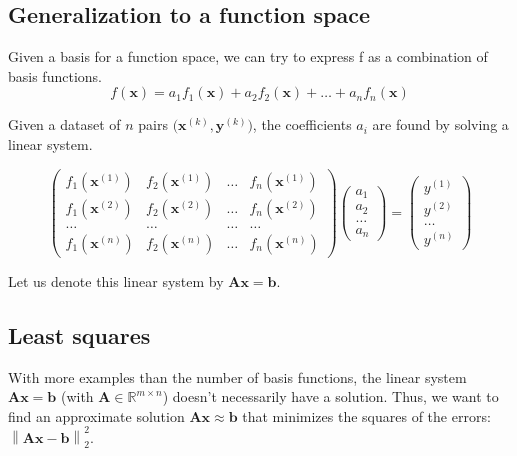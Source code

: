 \documentclass[10pt]{article}%
\renewcommand{\vec}[1]{\boldsymbol{#1}}
\newcommand{\norm}[1]{\left\lVert#1\right\rVert}
\begin{document}
\subsection{Generalization to a function space}
Given a basis for a function space, we can try to express {\Tt{}f\nwendquote} as a combination
of basis functions.
\[
f(\vec{x}) = a_1 f_1(\vec{x}) + a_2 f_2(\vec{x}) + \dots + a_n f_n(\vec{x})
\]

Given a dataset of $n$ pairs $\biggl(\vec{x}^{(k)},\vec{y}^{(k)}\biggr)$, the
coefficients $a_i$ are found by solving a linear system.

\[
\left( \begin{array}{ccccc}
f_1(\vec{x}^{(1)}) & f_2(\vec{x}^{(1)}) & \dots & f_n(\vec{x}^{(1)}) \\
f_1(\vec{x}^{(2)}) & f_2(\vec{x}^{(2)}) & \dots & f_n(\vec{x}^{(2)}) \\
\dots & \dots & \dots & \dots \\
f_1(\vec{x}^{(n)}) & f_2(\vec{x}^{(n)}) & \dots & f_n(\vec{x}^{(n)})
\end{array} \right)
\left( \begin{array}{c}
a_1 \\ a_2 \\ \dots \\ a_{n} 
\end{array} \right)
=
\left( \begin{array}{c}
y^{(1)} \\ y^{(2)} \\ \dots \\ y^{(n)} 
\end{array} \right)
\]

Let us denote this linear system by $\vec{A}\vec{x}=\vec{b}$.

\subsection{Least squares}
With more examples than the number of basis functions, the linear system
$\vec{A}\vec{x}=\vec{b}$ (with $\vec{A} \in \mathbb{R}^{m \times n}$) doesn't
necessarily have a solution.
Thus, we want to find an approximate solution $\vec{A}\vec{x}\approx\vec{b}$
that minimizes the squares of the errors: $\norm{\vec{A}\vec{x}-\vec{b}}^2_2$.
\end{document}
